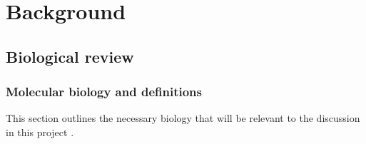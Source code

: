 \documentclass[12pt, twoside, a4paper]{article}
\begin{document}
\newpage

\section{Background}






\subsection{Biological review}
\subsubsection{Molecular biology and definitions}
This section outlines the necessary biology that will be relevant to the discussion in this project \cite{RefWorks:106, RefWorks:108, RefWorks:110, RefWorks:111}.
\end{document}
